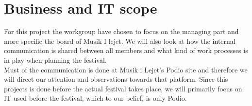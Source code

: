 \section{Business and IT scope}
For this project the workgroup have chosen to focus on the managing part and more specific the board of Musik I lejet. We will also look at how the internal communication is shared between all members and what kind of work processes is in play when planning the festival. \\
Must of the communication is done at Musik i Lejet's Podio site and therefore we will direct our attention and observations towards that platform. Since this projects is done before the actual festival takes place, we will primarily focus on IT used before the festival, which to our belief, is only Podio.  
